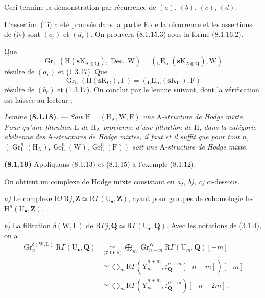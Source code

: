 \documentclass[11pt,leqno]{article}
\begin{document}
Ceci termine la démonstration par récurrence de \((a)\), \((b)\), \((c)\), \((d)\).

L’assertion (iii) a été prouvée dans la partie E de la récurrence et les assertions de (iv) sont \((c_{r})\) et \((d_{r})\). On prouvera (8.1.15.3) sous la forme (8.1.16.2).

Que
\[
\operatorname{Gr}_{\mathrm{L}}
(\mathrm{H}(\mathbf{s}\mathrm{K}_{\mathrm{A}\otimes\mathbf{Q}}),
\operatorname{Dec}_{1}\mathrm{W})
=
({}_{\mathrm{L}}\mathrm{E}_{\infty}
(\mathbf{s}\mathrm{K}_{\mathrm{A}\otimes\mathbf{Q}}),\mathrm{W})
\]
résulte de \((a_{r})\) et (1.3.17). Que
\[
\operatorname{Gr}_{\mathrm{L}}
(\mathrm{H}(\mathbf{s}\mathrm{K}_{\mathbf{C}}),\mathrm{F})
=
({}_{\mathrm{L}}\mathrm{E}_{\infty}
(\mathbf{s}\mathrm{K}_{\mathbf{C}}),\mathrm{F})
\]
résulte de \((b_{r})\) et (1.3.17). On conclut par le lemme suivant, dont la vérification est laissée au lecteur :

\textit{Lemme} \textbf{(8.1.18)}. — \textit{Soit \(\mathrm{H}=(\mathrm{H}_{\mathrm{A}},\mathrm{W},\mathrm{F})\) une \(\mathrm{A}\)-structure de Hodge mixte. Pour qu’une filtration \(\mathrm{L}\) de \(\mathrm{H}_{\mathrm{A}}\) provienne d’une filtration de \(\mathrm{H}\), dans la catégorie abélienne des \(\mathrm{A}\)-structures de Hodge mixtes, il faut et il suffit que pour tout \(n\), \((\operatorname{Gr}_{\mathrm{L}}^{n}(\mathrm{H}_{\mathrm{A}}),\operatorname{Gr}_{\mathrm{L}}^{n}(\mathrm{W}),\operatorname{Gr}_{\mathrm{L}}^{n}(\mathrm{F}))\) soit une \(\mathrm{A}\)-structure de Hodge mixte.}

\textbf{(8.1.19)} Appliquons (8.1.13) et (8.1.15) à l’exemple (8.1.12).

On obtient un complexe de Hodge mixte consistant en \textit{a)}, \textit{b)}, \textit{c)} ci-dessous.

\textit{a)} Le complexe \(\mathrm{R}\Gamma\mathrm{R}j_{\ast}\mathbf{Z}\simeq\mathrm{R}\Gamma(\mathrm{U}_{\bullet},\mathbf{Z})\), ayant pour groupes de cohomologie les \(\mathrm{H}^{n}(\mathrm{U}_{\bullet},\mathbf{Z})\).

\textit{b)} La filtration \(\delta(\mathrm{W},\mathrm{L})\) de \(\mathrm{R}\Gamma j_{\ast}\mathbf{Q}\simeq\mathrm{R}\Gamma(\mathrm{U}_{\bullet},\mathbf{Q})\). Avec les notations de (3.1.4), on a
\begin{align*}
\operatorname{Gr}_{n}^{\delta(\mathrm{W},\mathrm{L})}
\mathrm{R}\Gamma(\mathrm{U}_{\bullet},\mathbf{Q})
&\underset{\text{(7.1.6.5)}}{\simeq}
\bigoplus_m
\operatorname{Gr}_{n+m}^{\mathrm{W}}
\mathrm{R}\Gamma(\mathrm{U}_{m},\mathbf{Q})[-m]
\\
&\simeq
\bigoplus_m
\mathrm{R}\Gamma
(\widetilde{\mathrm{Y}}_{m}^{n+m},
\varepsilon_{\mathbf{Q}}^{n+m}[-n-m])[-m]
\\
&\simeq
\bigoplus_m
\mathrm{R}\Gamma
(\widetilde{\mathrm{Y}}_{m}^{n+m},
\varepsilon_{\mathbf{Q}}^{n+m})[-n-2m].
\end{align*}
\end{document}

